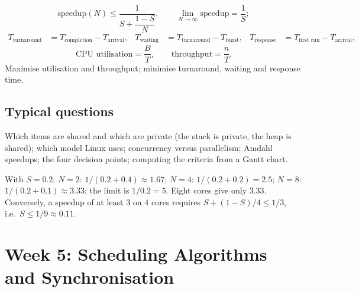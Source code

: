 \documentclass[11pt,a4paper]{article}
\begin{document}
\begin{keyidea}
\[
\text{speedup}(N) \le \frac{1}{S + \dfrac{1-S}{N}}, \qquad \lim_{N\to\infty} \text{speedup} = \frac{1}{S};
\]
\begin{align*}
T_{\text{turnaround}} &= T_{\text{completion}} - T_{\text{arrival}}, &
T_{\text{waiting}} &= T_{\text{turnaround}} - T_{\text{burst}}, &
T_{\text{response}} &= T_{\text{first run}} - T_{\text{arrival}},
\end{align*}
\[
\text{CPU utilisation} = \frac{B}{T}, \qquad \text{throughput} = \frac{n}{T}.
\]
Maximise utilisation and throughput; minimise turnaround, waiting and response time.
\end{keyidea}

\subsection*{Typical questions}
Which items are shared and which are private (the stack is private, the heap is shared); which model Linux uses; concurrency versus parallelism; Amdahl speedups; the four decision points; computing the criteria from a Gantt chart.

\begin{example}
With $S = 0.2$: $N = 2$: $1/(0.2 + 0.4) \approx 1.67$; $N = 4$: $1/(0.2 + 0.2) = 2.5$; $N = 8$: $1/(0.2 + 0.1) \approx 3.33$; the limit is $1/0.2 = 5$. Eight cores give only $3.33$. Conversely, a speedup of at least $3$ on $4$ cores requires $S + (1-S)/4 \le 1/3$, i.e.\ $S \le 1/9 \approx 0.11$.
\end{example}

\section{Week 5: Scheduling Algorithms and Synchronisation}
\label{sec:w5}
\end{document}
